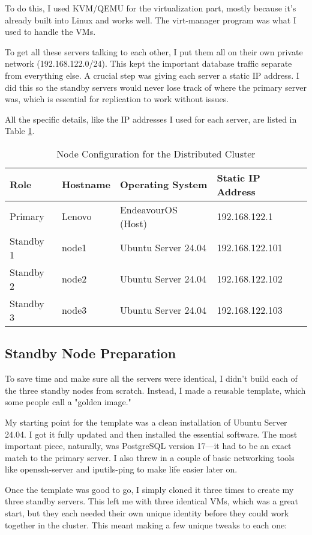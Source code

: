 \documentclass[conference]{IEEEtran}
\begin{document}
To do this, I used KVM/QEMU for the virtualization part, mostly because it’s already built into Linux and works well. The virt-manager program was what I used to handle the VMs.

To get all these servers talking to each other, I put them all on their own private network (192.168.122.0/24). This kept the important database traffic separate from everything else. A crucial step was giving each server a static IP address. I did this so the standby servers would never lose track of where the primary server was, which is essential for replication to work without issues.

All the specific details, like the IP addresses I used for each server, are listed in Table \ref{tab:node_config}.
\begin{table}[h!]
\centering
\caption{Node Configuration for the Distributed Cluster}
\label{tab:node_config}
\begin{tabular}{l l l l}
\toprule
\textbf{Role} & \textbf{Hostname} & \textbf{Operating System} & \textbf{Static IP Address} \\
\midrule
Primary   & Lenovo & EndeavourOS (Host) & 192.168.122.1 \\
Standby 1 & node1             & Ubuntu Server 24.04  & 192.168.122.101 \\
Standby 2 & node2             & Ubuntu Server 24.04  & 192.168.122.102 \\
Standby 3 & node3             & Ubuntu Server 24.04  & 192.168.122.103 \\
\bottomrule
\end{tabular}
\end{table}

\subsection{Standby Node Preparation}
To save time and make sure all the servers were identical, I didn't build each of the three standby nodes from scratch. Instead, I made a reusable template, which some people call a "golden image."

My starting point for the template was a clean installation of Ubuntu Server 24.04. I got it fully updated and then installed the essential software. The most important piece, naturally, was PostgreSQL version 17—it had to be an exact match to the primary server. I also threw in a couple of basic networking tools like openssh-server and iputils-ping to make life easier later on.

Once the template was good to go, I simply cloned it three times to create my three standby servers. This left me with three identical VMs, which was a great start, but they each needed their own unique identity before they could work together in the cluster. This meant making a few unique tweaks to each one:
\end{document}
